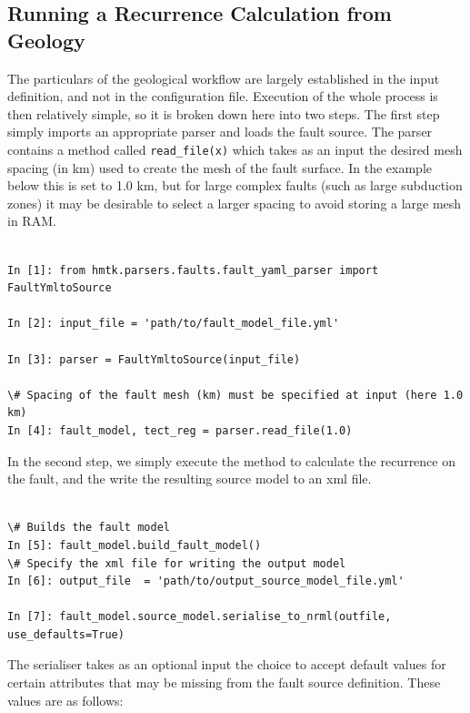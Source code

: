 \subsection{Running a Recurrence Calculation from Geology}

The particulars of the geological workflow are largely established in the input definition, and not in the configuration file. Execution of the whole process is then relatively simple, so it is broken down here into two steps. The first step simply imports an appropriate parser and loads the fault source. The parser contains a method called \verb=read_file(x)= which takes as an input the desired mesh spacing (in km) used to create the mesh of the fault surface. In the example below this is set to 1.0 km, but for large complex faults (such as large subduction zones) it may be desirable to select a larger spacing to avoid storing a large mesh in RAM.

\begin{Verbatim}[frame=single, commandchars=\\\{\}, fontsize=\scriptsize]

In [1]: from hmtk.parsers.faults.fault_yaml_parser import FaultYmltoSource

In [2]: input_file = 'path/to/fault_model_file.yml'

In [3]: parser = FaultYmltoSource(input_file)

\# Spacing of the fault mesh (km) must be specified at input (here 1.0 km) 
In [4]: fault_model, tect_reg = parser.read_file(1.0)

\end{Verbatim}

In the second step, we simply execute the method to calculate the recurrence on the fault, and the write the resulting source model to an xml file. 

\begin{Verbatim}[frame=single, commandchars=\\\{\}, fontsize=\scriptsize]

\# Builds the fault model
In [5]: fault_model.build_fault_model()
\# Specify the xml file for writing the output model
In [6]: output_file  = 'path/to/output_source_model_file.yml'

In [7]: fault_model.source_model.serialise_to_nrml(outfile, use_defaults=True)
\end{Verbatim}

The serialiser takes as an optional input the choice to accept default values for certain attributes that may be missing from the fault source definition. These values are as follows:

